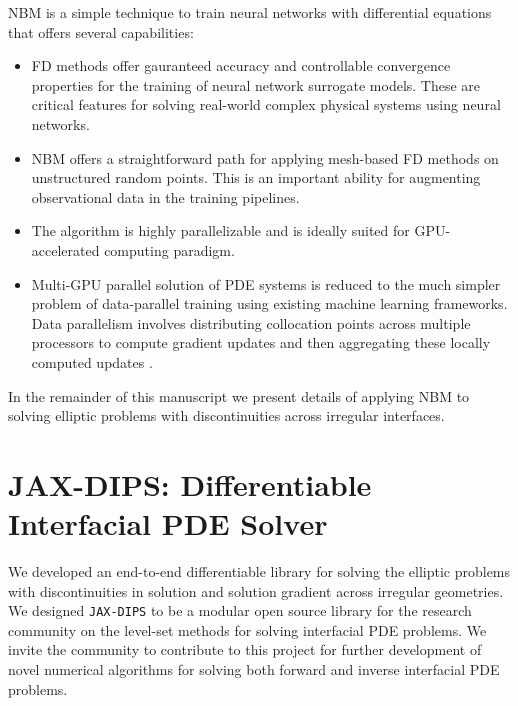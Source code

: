 \documentclass{elsarticle}
\begin{document}
NBM is a simple technique to train neural networks with differential equations that offers several capabilities:

\begin{itemize}
\item FD methods offer gauranteed accuracy and controllable convergence properties for the training of neural network surrogate models. These are critical features for solving real-world complex physical systems using neural networks.

\item NBM offers a straightforward path for applying mesh-based FD methods on unstructured random points. This is an important ability for augmenting observational data in the training pipelines.

\item The algorithm is highly parallelizable and is ideally suited for GPU-accelerated computing paradigm. 

\item Multi-GPU parallel solution of PDE systems is reduced to the much simpler problem of data-parallel training using existing machine learning frameworks. Data parallelism involves distributing collocation points across multiple processors to compute gradient updates and then aggregating these locally computed updates \cite{shallue2018measuring}.


\end{itemize}


In the remainder of this manuscript we present details of applying NBM to solving elliptic problems with discontinuities across irregular interfaces.










\section{JAX-DIPS: Differentiable Interfacial PDE Solver} \label{sec:dips}
We developed an end-to-end differentiable library for solving the elliptic problems with discontinuities in solution and solution gradient across irregular geometries. We designed \texttt{JAX-DIPS} to be a modular open source library for the research community on the level-set methods for solving interfacial PDE problems. We invite the community to contribute to this project for further development of novel numerical algorithms for solving both forward and inverse interfacial PDE problems.
\end{document}
